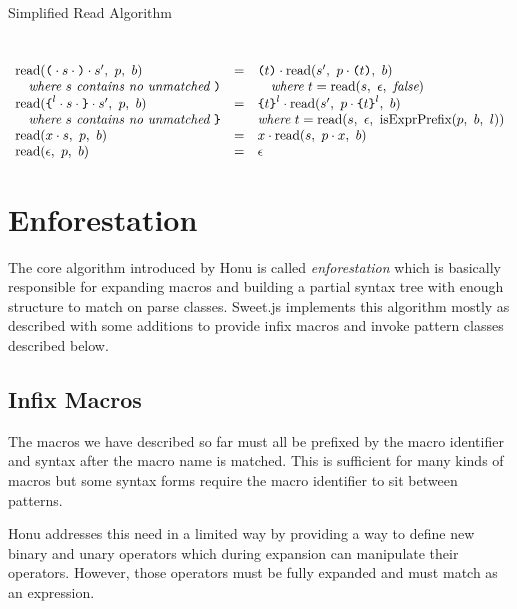 \documentclass[preprint,10pt]{sigplanconf}
\begin{document}
\begin{displayfigure*}{\label{fig:simpleread}Simplified Read Algorithm}
\[\begin{array}{lcll}
    \\ \\
    

    \textrm{read}(\texttt{(} \cdot s \cdot \texttt{)} \cdot s',~p,~b)
    &=&
    \texttt{(}t\texttt{)} \cdot 
      \textrm{read}(s',~p \cdot \texttt{(}t\texttt{)},~b)
    
    \\
    \quad \textit{where}~s~\textit{contains no unmatched}~\texttt{)} 
    &&\quad \textit{where}~t = \textrm{read}(s,~\epsilon,~\textit{false}) 
    \\
    \textrm{read}(
      \texttt{\{}^l \cdot s \cdot \texttt{\}} \cdot s'
    ,~p,~b)
    &=&
    \texttt{\{}t\texttt{\}}^l \cdot 
      \textrm{read}(s',~
        p \cdot \texttt{\{}t\texttt{\}}^l
      ,~b)
    
    \\
    \quad \textit{where}~s~\textit{contains no unmatched}~\texttt{\}} 
    && \textit{where}~t = \textrm{read}(s,~\epsilon,~\textrm{isExprPrefix}(p,~b,~l))
    \\
    \textrm{read}(x \cdot s,~p,~b)
    &=&
    x \cdot 
      \textrm{read}(s,~p \cdot x,~b)
   
    \\
    \textrm{read}(\epsilon,~p,~b)
    &=&
    \epsilon \\
  \end{array}
\]
\end{displayfigure*}


\section{Enforestation}
\label{sec-4}

The core algorithm introduced by Honu is called \emph{enforestation} which
is basically responsible for expanding macros and building a partial
syntax tree with enough structure to match on parse classes. Sweet.js
implements this algorithm mostly as described with some additions to
provide infix macros and invoke pattern classes described below.

\subsection{Infix Macros}
\label{sec-4-1}
The macros we have described so far must all be prefixed by the macro
identifier and syntax after the macro name is matched. This is
sufficient for many kinds of macros but some syntax forms require the
macro identifier to sit between patterns.

Honu addresses this need in a limited way by providing a way to define
new binary and unary operators which during expansion can manipulate
their operators. However, those operators must be fully expanded and
must match as an expression.
\end{document}
